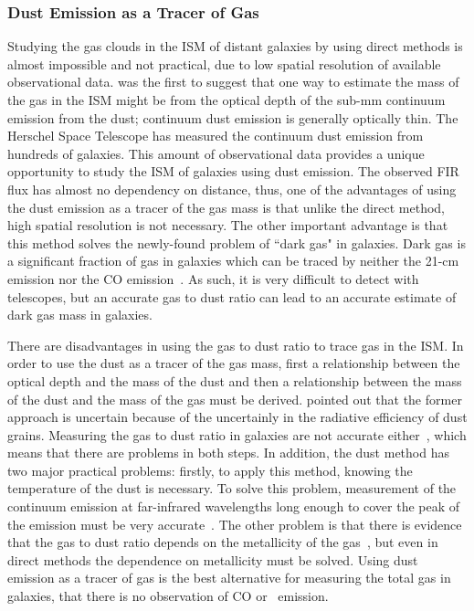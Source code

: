 \subsubsection{Dust Emission as a Tracer of Gas} 

Studying the gas clouds in the ISM of distant galaxies by using direct methods is almost impossible and not practical, due to low spatial resolution of available observational data.
\cite{Hildebran83} was the first to suggest that one way to estimate the mass of the gas in the ISM might be from the optical depth of the sub-mm continuum emission from the dust; continuum dust emission is generally optically thin. 
The Herschel Space Telescope \cite{Pilbratt10} has measured the continuum dust emission from hundreds of galaxies\citep{Eales10, Oliver12}. 
This amount of observational data provides a unique opportunity to study the ISM of galaxies using dust emission. 
The observed FIR flux has almost no dependency on distance, thus, one of the advantages of using the dust emission as a tracer of the gas mass is that unlike the direct method, high spatial resolution is not necessary. 
The other important advantage is that this method solves the newly-found problem of ``dark gas" in galaxies. 
Dark gas is a significant fraction of gas in galaxies which can be traced by neither the 21-cm emission nor the CO emission~\citep{Abdo10}. 
As such, it is very difficult to detect with telescopes, but an accurate gas to dust ratio can lead to an accurate estimate of dark gas mass in galaxies. 

There are disadvantages in using the gas to dust ratio to trace gas in the ISM.
In order to use the dust as a tracer of the gas mass, first a relationship between the optical depth and the mass of the dust and then a relationship between the mass of the dust and the mass of the gas must be derived.
\cite{Draine03} pointed out that the former approach is uncertain because of the uncertainly in the radiative efficiency of dust grains. 
Measuring the gas to dust ratio in galaxies are not accurate either~\citep{Hildebran83}, which means that there are problems in both steps. 
In addition, the dust method has two major practical problems: firstly, to apply this method, knowing the temperature of the dust is necessary. 
To solve this problem, measurement of the continuum emission at far-infrared wavelengths long enough to cover the peak of the emission must be very accurate~\citep{Ealas12}. 
The other problem is that there is evidence that the gas to dust ratio depends on the metallicity of the gas~\citep{Lisenfeld98, Draine07}, but even in direct methods the dependence on metallicity must be solved. 
Using dust emission as a tracer of gas is the best alternative for measuring the total gas in galaxies, that there is no observation of CO or \hi~emission. 

